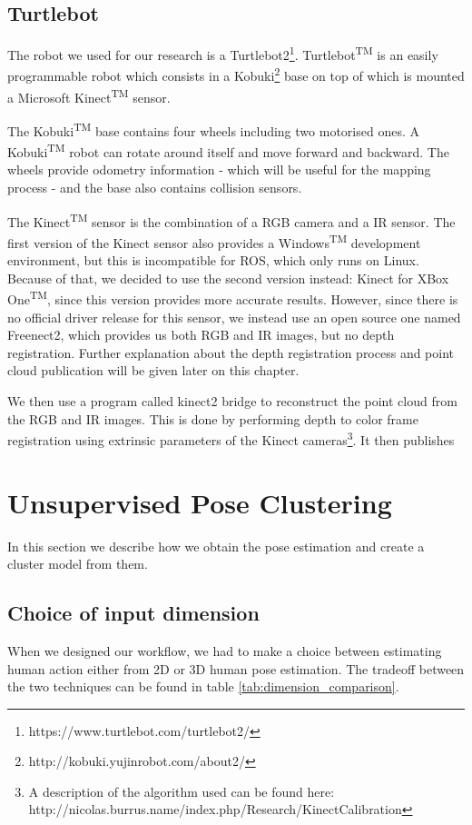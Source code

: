 \subsection{Turtlebot}
The robot we used for our research is a Turtlebot2\footnote{https://www.turtlebot.com/turtlebot2/}. Turtlebot\textsuperscript{TM} is an easily programmable robot which consists in a Kobuki\footnote{http://kobuki.yujinrobot.com/about2/} base on top of which is mounted a Microsoft Kinect\textsuperscript{TM} sensor. 

The Kobuki\textsuperscript{TM} base contains four wheels including two motorised ones. A Kobuki\textsuperscript{TM} robot can rotate around itself and move forward and backward. The wheels provide odometry information - which will be useful for the mapping process - and the base also contains collision sensors.

The Kinect\textsuperscript{TM} sensor is the combination of a RGB camera and a IR sensor. The first version of the Kinect sensor also provides a Windows\textsuperscript{TM} development environment, but this is incompatible for ROS, which only runs on Linux. Because of that, we decided to use the second version instead: Kinect for XBox One\textsuperscript{TM}, since this version provides more accurate results\cite{kinect_comparison}. However, since there is no official driver release for this sensor, we instead use an open source one named Freenect2\cite{libfreenect2}, which provides us both RGB and IR images, but no depth registration. Further explanation about the depth registration process and point cloud publication will be given later on this chapter.

We then use a program called kinect2 bridge\cite{iai_kinect2} to reconstruct the point cloud from the RGB and IR images. This is done by performing depth to color frame registration using extrinsic parameters of the Kinect cameras\footnote{\raggedright A description of the algorithm used can be found here: http://nicolas.burrus.name/index.php/Research/KinectCalibration}.
It then publishes 

\section{Unsupervised Pose Clustering}
In this section we describe how we obtain the pose estimation and create a cluster model from them.

\subsection{Choice of input dimension}
When we designed our workflow, we had to make a choice between estimating human action either from 2D or 3D human pose estimation. The tradeoff between the two techniques can be found in table \ref{tab:dimension_comparison}.

